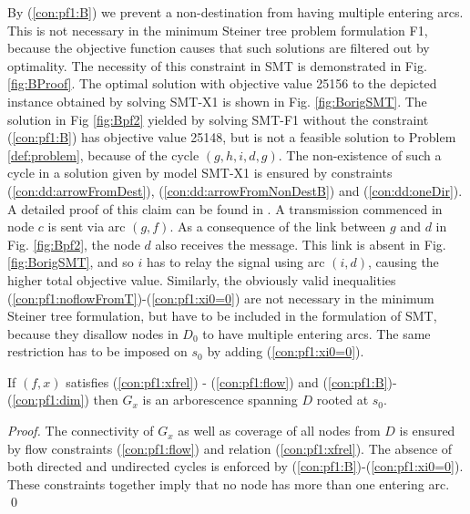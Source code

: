      By (\ref{con:pf1:B}) we prevent a non-destination from having multiple entering arcs. This is not necessary in the minimum Steiner tree problem formulation F1, because the objective function causes that such solutions are filtered out by optimality. The necessity of this constraint in SMT is demonstrated in Fig. \ref{fig:BProof}. The optimal solution with objective value 25156 to the depicted instance obtained by solving SMT-X1 is shown in Fig. \ref{fig:BorigSMT}. The solution in Fig \ref{fig:Bpf2} yielded by solving SMT-F1 without the constraint (\ref{con:pf1:B}) has objective value 25148, but is not a feasible solution to Problem \ref{def:problem}, because of the cycle $(g,h,i,d,g)$. The non-existence of such a cycle in a solution given by model SMT-X1 is ensured by constraints (\ref{con:dd:arrowFromDest}), (\ref{con:dd:arrowFromNonDestB}) and (\ref{con:dd:oneDir}). A detailed proof of this claim can be found in \cite{ivanova16isco}. A transmission commenced in node $c$ is sent via arc $(g,f)$. As a consequence of the link between $g$ and $d$ in Fig. \ref{fig:Bpf2}, the node $d$ also receives the message. This link is absent in Fig. \ref{fig:BorigSMT}, and so $i$ has to relay the signal using arc $(i,d)$, causing the higher total objective value. Similarly, the obviously valid inequalities (\ref{con:pf1:noflowFromT})-(\ref{con:pf1:xi0=0}) are not necessary in the minimum Steiner tree formulation, but have to be included in the formulation of SMT, because they  disallow nodes in $D_0$ to have multiple entering arcs. The same restriction has to be imposed on $s_0$ by adding (\ref{con:pf1:xi0=0}).
   
\begin{prop}
\label{prop:modelcorrect}
If $(f,x)$ satisfies (\ref{con:pf1:xfrel}) - (\ref{con:pf1:flow}) and (\ref{con:pf1:B})-(\ref{con:pf1:dim}) then $G_{x}$ is an arborescence spanning $D$ rooted at $s_0$.
\end{prop}
 
 \begin{proof}
 The connectivity of $G_{x}$ as well as coverage of all nodes from $D$ is ensured by flow constraints (\ref{con:pf1:flow}) and relation (\ref{con:pf1:xfrel}). The absence of both directed and undirected cycles is enforced by (\ref{con:pf1:B})-(\ref{con:pf1:xi0=0}). These constraints together imply that no node has more than one entering arc. %
 \qed
 \end{proof}
 
